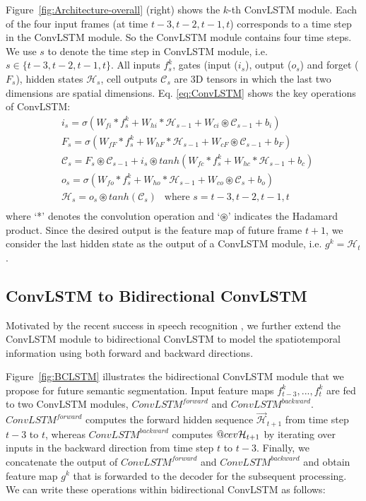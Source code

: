 \documentclass{bmvc2k}
\makeatletter
\DeclareRobustCommand{\cev}[1]{%
  \mathpalette\do@cev{#1}%
}
\newcommand{\do@cev}[2]{%
  \fix@cev{#1}{+}%
  \reflectbox{$\m@th#1\vec{\reflectbox{$\fix@cev{#1}{-}\m@th#1#2\fix@cev{#1}{+}$}}$}%
  \fix@cev{#1}{-}%
}
\newcommand{\fix@cev}[2]{%
  \ifx#1\displaystyle
    \mkern#23mu
  \else
    \ifx#1\textstyle
      \mkern#23mu
    \else
      \ifx#1\scriptstyle
        \mkern#22mu
      \else
        \mkern#22mu
      \fi
    \fi
  \fi
}
\makeatother
\begin{document}
Figure~\ref{fig:Architecture-overall} (right) shows the $k$-th ConvLSTM module. Each of the four input frames (at time $t-3, t-2, t-1, t$) corresponds to a time step in the ConvLSTM module. So the ConvLSTM module contains four time steps. We use $s$ to denote the time step in ConvLSTM module, i.e. $s\in\{t-3,t-2,t-1,t\}$. All inputs $f^k_{s}$, gates (input ($i_{s}$), output ($o_{s}$) and forget ($F_{s}$), hidden states $\mathcal{H}_{s}$, cell outputs  $\mathcal{C}_{s}$ are 3D tensors in which the last two dimensions are spatial dimensions. Eq. \ref{eq:ConvLSTM} shows the key operations of ConvLSTM:
\begin{equation}\label{eq:ConvLSTM}
\begin{aligned}
& i_{s} = \sigma(W_{fi}*f^k_{s} + W_{hi}*\mathcal{H}_{s-1} + W_{ci}  \circledast \mathcal{C}_{s-1} + b_{i}) \\
& F_{s} = \sigma(W_{fF}*f^k_{s} + W_{hF}*\mathcal{H}_{s-1} + W_{cF} \circledast \mathcal{C}_{s-1} + b_{F}) \\
& \mathcal{C}_{s} = F_{s} \circledast \mathcal{C}_{s-1} + i_{s} \circledast tanh(W_{fc} * f^k_{s} + W_{hc} * \mathcal{H}_{s-1} + b_{c}) \\
& o_{s} = \sigma(W_{fo} * f^k_{s} + W_{ho} * \mathcal{H}_{s-1} + W_{co} \circledast \mathcal{C}_{s} + b_{o})\\
& \mathcal{H}_{s} = o_{s} \circledast tanh(\mathcal{C}_{s}) \ \ \textrm { where } s=t-3, t-2, t-1, t\\
\end{aligned}
\end{equation}\noindent where `*' denotes the convolution operation and `$\circledast$' indicates the Hadamard product. Since the desired output is the feature map of future frame $t+1$, we consider the last hidden state as the output of a ConvLSTM module, i.e. $g^{k}=\mathcal{H}_{t}$.

\subsection{ConvLSTM to Bidirectional ConvLSTM}\label{sec:bilstm}
Motivated by the recent success in speech recognition \cite{zhang2017very}, we further extend the ConvLSTM module to bidirectional ConvLSTM to model the spatiotemporal information using both forward and backward directions.  

Figure~\ref{fig:BCLSTM} illustrates the bidirectional ConvLSTM module that we propose for future semantic segmentation. Input feature maps $f^k_{t-3},...,f^k_{t}$ are fed to two ConvLSTM modules, $ConvLSTM^{forward}$ and $ConvLSTM^{backward}$. $ConvLSTM^{forward}$ computes the forward hidden sequence $\vec{\mathcal{H}}_{t+1}$ from time step $t-3$ to $t$, whereas $ConvLSTM^{backward}$ computes $\cev{\mathcal{H}}_{t+1}$ by iterating over inputs in the backward direction from time step $t$ to $t-3$. Finally, we concatenate the output of $ConvLSTM^{forward}$ and $ConvLSTM^{backward}$ and obtain feature map $g^k$ that is forwarded to the decoder for the subsequent processing. We can write these operations within bidirectional ConvLSTM as follows:
\end{document}
